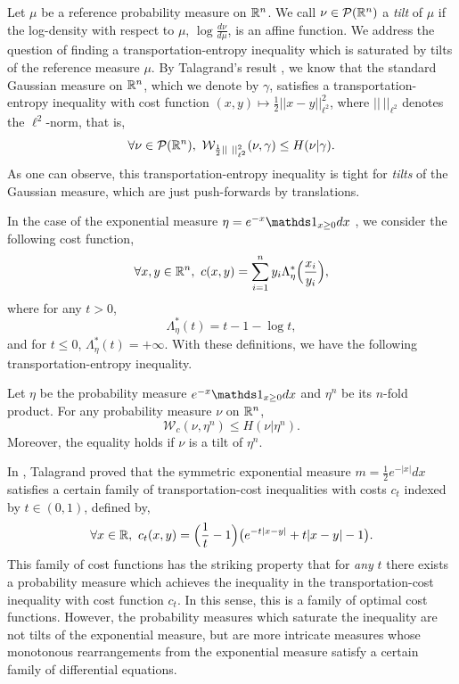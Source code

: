 \documentclass[a4paper,oneside,11pt]{article}
\begin{document}
Let $\mu$ be a reference  probability measure on $\mathbb{R}^n$. We call $\nu \in \mathcal{P}(\mathbb{R}^n)$ a \textit{tilt} of $\mu$ if the log-density with respect to $\mu$,  $\log \frac{d \nu}{d \mu}$, is an affine function. We address the question of finding a transportation-entropy inequality which is saturated by tilts of the reference measure $\mu$.  By Talagrand's result \cite{Talagrand2}, we know that the standard Gaussian measure on $\mathbb{R}^n$, which we denote by $\gamma$, satisfies a transportation-entropy inequality with cost function $(x,y)\mapsto \frac{1}{2} ||x-y||_{\ell^2}^2$, where $|| \ ||_{\ell^2}$ denotes the $\ell^2$-norm, that is,
\begin{equation} \label{TalG} \forall \nu \in \mathcal{P}(\mathbb{R}^n), \ \mathcal{W}_{\frac{1}{2} || \ ||_{\ell^2}^2 } (\nu,\gamma) \leq H(\nu|\gamma).\end{equation}
 As one can observe, this transportation-entropy inequality is tight for \textit{tilts} of the Gaussian measure, which are just push-forwards by translations.

In the case of the exponential measure $\eta =e^{-x}\Car_{x\geq 0} dx$ , we consider the following cost function,
\begin{equation} \label{defcoutexp}  \forall x,y \in \RR^n, \ c(x,y) = \sum_{i=1}^n  y_i \Lambda^*_{\eta}\Big( \frac{x_i}{y_i}\Big),\end{equation}
where for any $t >0$,
$$\Lambda^*_\eta (t) = t- 1-\log t,$$
and for $t\leq 0$, $\Lambda^*_\eta(t) = +\infty$.
With these definitions, we have the following transportation-entropy inequality.

\begin{Pro}\label{transpoexp}
Let $\eta$ be the probability measure $e^{-x}\Car_{x\geq 0} dx$ and $\eta^n$ be its $n$-fold product. For any probability measure $\nu$ on $\mathbb{R}^n$,
$$\mathcal{W}_c(\nu,\eta^n) \leq H(\nu| \eta^n).$$
Moreover, the equality holds if $\nu$ is a tilt of $\eta^n$.
\end{Pro}
\begin{Rem}
In \cite{Talagrand2}, Talagrand proved that the symmetric exponential measure $m = \frac{1}{2}e^{-|x| } dx$ satisfies a certain family of transportation-cost inequalities with costs $c_t$ indexed by $t \in (0,1)$, defined by,
$$\forall x \in \mathbb{R}, \  c_t(x,y) = \Big(\frac{1}{t}-1\Big) \big( e^{-t |x-y|} + t |x-y| -1\big).$$
This family of cost functions has the striking property that for \textit{any} $t$ there exists a probability measure which achieves the inequality in the transportation-cost inequality with cost function $c_t$. In this sense, this is a family of optimal cost functions. However, the probability measures which saturate the inequality are not tilts of the exponential measure, but are more intricate measures whose monotonous rearrangements from the exponential measure satisfy a certain family of differential equations.

\end{Rem}
\end{document}
